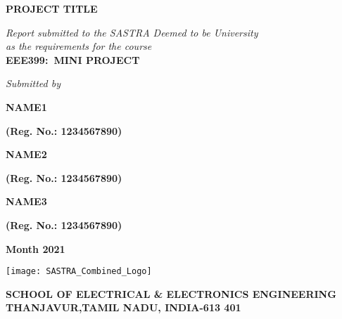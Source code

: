 \documentclass[a4paper, 12pt, oneside]{sastra}
\begin{document}
\onehalfspacing
	
	\thispagestyle{empty}
	\begin{center}
		\Large{\textbf{PROJECT TITLE}}
	\end{center}
	\bigskip{}
	\bigskip{}
	\bigskip{}
	\begin{center}
		\textit{Report submitted to the SASTRA Deemed to be University\\ 
			as the requirements for the course\\
		}
		\bigskip{}
		\bigskip{}
		\large{\textbf{EEE399:~MINI PROJECT}}
		\bigskip{}
		\bigskip{}
		\bigskip{}
		\bigskip{}
		\bigskip{}
		\bigskip{}
	\end{center}
	\begin{center}
		\textit{Submitted by}\\
	\end{center}
	\begin{center}
		\begin{singlespacing}
			\textbf{\Large{NAME1}}
			
			\textbf{\large{(Reg. No.: 1234567890)}}
			
			\textbf{\Large{NAME2}}
			
			\textbf{\large{(Reg. No.: 1234567890)}}
			
			\textbf{\Large{NAME3}}
			
			\textbf{\large{(Reg. No.: 1234567890)}}
		\end{singlespacing}
	\end{center}
	\bigskip{}
	
	\begin{center}
		\Large{\textbf{Month 2021}}   %
	\end{center}
	\bigskip{}
	\begin{center}
		\texttt{[image: SASTRA\_Combined\_Logo]}
	\end{center}
	
	\begin{center}
		\large{\textbf{SCHOOL OF ELECTRICAL \& ELECTRONICS ENGINEERING}} %
		{\textbf{THANJAVUR,TAMIL NADU, INDIA-613 401}}
	\end{center}
	
\end{document}
